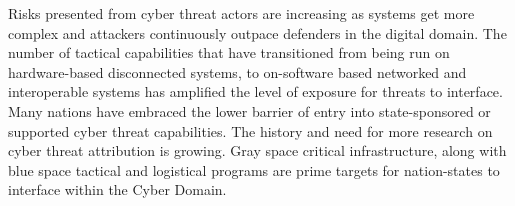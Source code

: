 \documentclass[12pt]{report}
\begin{document}

Risks presented from cyber threat actors are increasing as systems get more complex and attackers continuously outpace defenders in the digital domain.  The number of tactical capabilities that have transitioned from being run on hardware-based disconnected systems, to on-software based networked and interoperable systems has amplified the level of exposure for threats to interface.   Many nations have embraced the lower barrier of entry into state-sponsored or supported cyber threat capabilities. The history and need for more research on cyber threat attribution is growing.  Gray space critical infrastructure, along with blue space tactical and logistical programs are prime targets for nation-states to interface within the Cyber Domain.
\end{document}
